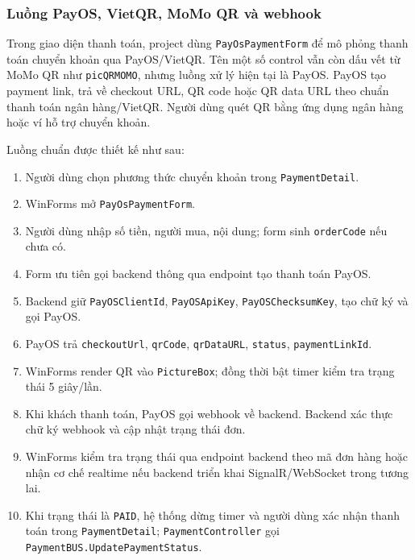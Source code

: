 \documentclass[12pt,a4paper]{article}
\numberwithin{figure}{subsection}
\numberwithin{table}{subsection}
\begin{document}
\subsubsection{Luồng PayOS, VietQR, MoMo QR và webhook}

Trong giao diện thanh toán, project dùng \texttt{PayOsPaymentForm} để mô phỏng thanh toán chuyển khoản qua PayOS/VietQR. Tên một số control vẫn còn dấu vết từ MoMo QR như \texttt{picQRMOMO}, nhưng luồng xử lý hiện tại là PayOS. PayOS tạo payment link, trả về checkout URL, QR code hoặc QR data URL theo chuẩn thanh toán ngân hàng/VietQR. Người dùng quét QR bằng ứng dụng ngân hàng hoặc ví hỗ trợ chuyển khoản.

Luồng chuẩn được thiết kế như sau:

\begin{enumerate}
    \item Người dùng chọn phương thức chuyển khoản trong \texttt{PaymentDetail}.
    \item WinForms mở \texttt{PayOsPaymentForm}.
    \item Người dùng nhập số tiền, người mua, nội dung; form sinh \texttt{orderCode} nếu chưa có.
    \item Form ưu tiên gọi backend thông qua endpoint tạo thanh toán PayOS.
    \item Backend giữ \texttt{PayOSClientId}, \texttt{PayOSApiKey}, \texttt{PayOSChecksumKey}, tạo chữ ký và gọi PayOS.
    \item PayOS trả \texttt{checkoutUrl}, \texttt{qrCode}, \texttt{qrDataURL}, \texttt{status}, \texttt{paymentLinkId}.
    \item WinForms render QR vào \texttt{PictureBox}; đồng thời bật timer kiểm tra trạng thái 5 giây/lần.
    \item Khi khách thanh toán, PayOS gọi webhook về backend. Backend xác thực chữ ký webhook và cập nhật trạng thái đơn.
    \item WinForms kiểm tra trạng thái qua endpoint backend theo mã đơn hàng hoặc nhận cơ chế realtime nếu backend triển khai SignalR/WebSocket trong tương lai.
    \item Khi trạng thái là \texttt{PAID}, hệ thống dừng timer và người dùng xác nhận thanh toán trong \texttt{PaymentDetail}; \texttt{PaymentController} gọi \texttt{PaymentBUS.UpdatePaymentStatus}.
\end{enumerate}
\end{document}
